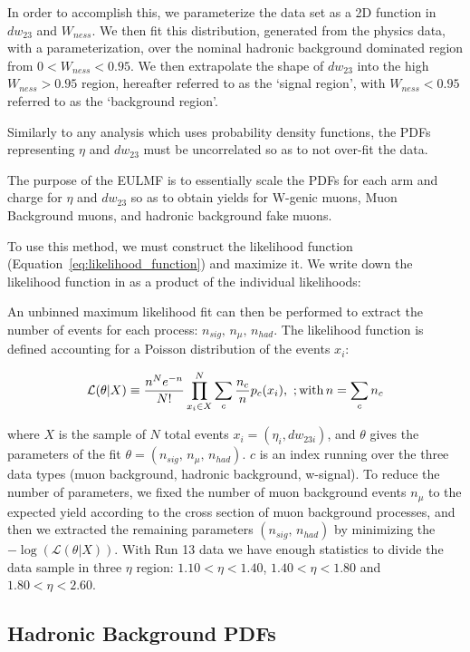 In order to accomplish this, we parameterize the data set as a 2D function in
$dw_{23}$ and $W_{ness}$. We then fit this distribution, generated from the
physics data, with a parameterization, over the nominal hadronic background
dominated region from $0 < W_{ness} < 0.95$. We then extrapolate the shape
of $dw_{23}$ into the high $W_{ness} > 0.95$ region, hereafter referred to as
the `signal region', with $W_{ness} < 0.95$ referred to as the `background
region'.

Similarly to any analysis which uses probability density functions, the PDFs
representing $\eta$ and $dw_{23}$ must be uncorrelated so as to not over-fit
the data.

The purpose of the EULMF is to essentially scale the PDFs for each arm and
charge for $\eta$ and $dw_{23}$ so as to obtain yields for W-genic muons, Muon
Background muons, and hadronic background fake muons.

To use this method, we must construct the likelihood function
(Equation~\ref{eq:likelihood_function}) and maximize it. We write down the
likelihood function in as a product of the individual likelihoods:


An unbinned maximum likelihood fit can then be performed to extract the number
of events for each process: $n_{sig},\,n_\mu,\, n_{had}$. The likelihood
function is defined accounting for a Poisson  distribution of the events $x_i$:

\begin{equation} 
  \mathcal{L}(\theta|X) 
  \equiv
  \frac{n^N e^{-n}}{N!} \prod_{x_i \in X}^N
  \sum_c \frac{n_c}{n} p_c (x_i), \
  ;{\rm with}\, 
  n=\sum_c n_c 
  \label{eq:likelihood_function}
\end{equation} 

where $X$ is the sample of $N$ total events $x_i = (\eta_i,dw_{23i})$, and
$\theta$ gives the parameters of the fit $\theta = (n_{sig},\,n_\mu,\,
n_{had})$.  $c$ is an index running over the three data types (muon background,
hadronic background, w-signal). To reduce the number of parameters, we fixed the
number of muon background events $n_\mu$ to the expected yield according to the
cross section of muon background processes, and then we extracted the remaining
parameters $(n_{sig},\, n_{had})$ by minimizing the
$-\log(\mathcal{L}(\theta|X))$.  With Run 13 data we have enough statistics to
divide the data sample in three $\eta$ region: $1.10 < \eta < 1.40$, $1.40 <
\eta < 1.80$ and $1.80 < \eta < 2.60$. 

\subsection{Hadronic Background PDFs}

